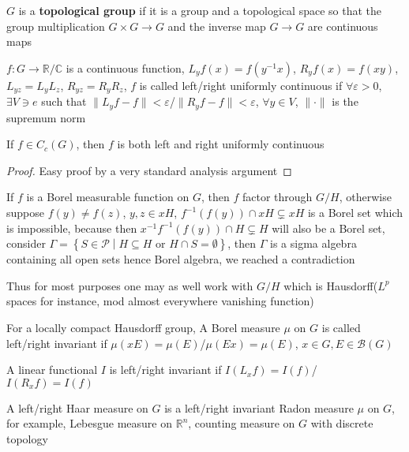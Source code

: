 \documentclass[main]{subfiles}
\begin{document}
\begin{definition}
$G$ is a \textbf{topological group} if it is a group and a topological space so that the group multiplication $G\times G\to G$ and the inverse map $G\to G$ are continuous maps
\end{definition}

\begin{definition}
$f:G\to \mathbb R/\mathbb C$ is a continuous function, $L_yf(x)=f(y^{-1}x)$, $R_yf(x)=f(xy)$, $L_{yz}=L_yL_z$, $R_{yz}=R_yR_z$, $f$ is called left/right uniformly continuous if $\forall\varepsilon>0$, $\exists V\ni e$ such that $\|L_yf-f\|<\varepsilon$/$\|R_yf-f\|<\varepsilon$, $\forall y\in V$, $\|\cdot\|$ is the supremum norm
\end{definition}

\begin{proposition}
If $f\in C_c(G)$, then $f$ is both left and right uniformly continuous
\end{proposition}

\begin{proof}
Easy proof by a very standard analysis argument
\end{proof}

\begin{definition}
If $f$ is a Borel measurable function on $G$, then $f$ factor through $G/H$, otherwise suppose $f(y)\neq f(z)$, $y,z\in xH$, $f^{-1}(f(y))\cap xH\subsetneq xH$ is a Borel set which is impossible, because then $x^{-1}f^{-1}(f(y))\cap H\subsetneq H$ will also be a Borel set, consider $\Gamma=\left\{S\in \mathscr{P}\middle| H\subseteq H \text{ or } H\cap S=\emptyset\right\}$, then $\Gamma$ is a sigma algebra containing all open sets hence Borel algebra, we reached a contradiction  \par
Thus for most purposes one may as well work with $G/H$ which is Hausdorff($L^p$ spaces for instance, mod almost everywhere vanishing function) \par
For a locally compact Hausdorff group, A Borel measure $\mu$ on $G$ is called left/right invariant if $\mu(xE)=\mu(E)$/$\mu(Ex)=\mu(E)$, $x\in G, E\in \mathscr{B}(G)$ \par
A linear functional $I$ is left/right invariant if $I(L_xf)=I(f)$/$I(R_xf)=I(f)$ \par
A left/right Haar measure on $G$ is a left/right invariant Radon measure $\mu$ on $G$, for example, Lebesgue measure on $\mathbb R^n$, counting measure on $G$ with discrete topology
\end{definition}
\end{document}
